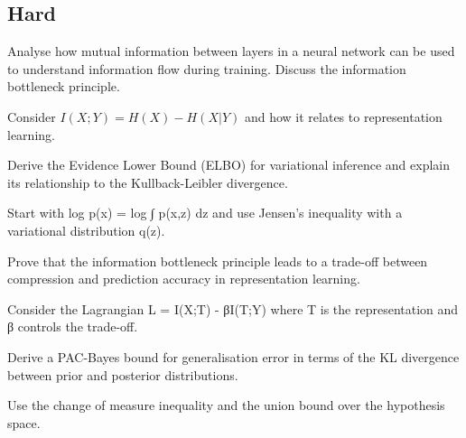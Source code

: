 \subsection*{Hard}

\begin{exercisebox}[hard]
\begin{problem}
Analyse how mutual information between layers in a neural network can be used to understand information flow during training. Discuss the information bottleneck principle.
\end{problem}
\begin{hintbox}
Consider $I(X;Y) = H(X) - H(X|Y)$ and how it relates to representation learning.
\end{hintbox}
\end{exercisebox}


\begin{exercisebox}[hard]
\begin{problem}
Derive the Evidence Lower Bound (ELBO) for variational inference and explain its relationship to the Kullback-Leibler divergence.
\end{problem}
\begin{hintbox}
Start with log p(x) = log ∫ p(x,z) dz and use Jensen's inequality with a variational distribution q(z).
\end{hintbox}
\end{exercisebox}


\begin{exercisebox}[hard]
\begin{problem}
Prove that the information bottleneck principle leads to a trade-off between compression and prediction accuracy in representation learning.
\end{problem}
\begin{hintbox}
Consider the Lagrangian L = I(X;T) - βI(T;Y) where T is the representation and β controls the trade-off.
\end{hintbox}
\end{exercisebox}


\begin{exercisebox}[hard]
\begin{problem}
Derive a PAC-Bayes bound for generalisation error in terms of the KL divergence between prior and posterior distributions.
\end{problem}
\begin{hintbox}
Use the change of measure inequality and the union bound over the hypothesis space.
\end{hintbox}
\end{exercisebox}



